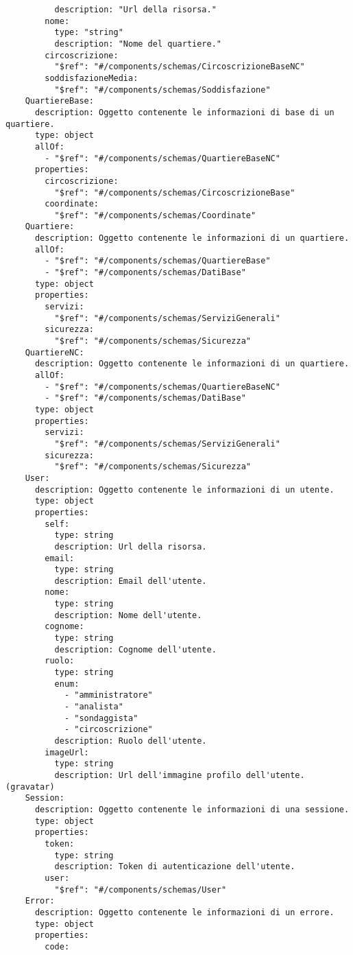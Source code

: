 \begin{verbatim}
          description: "Url della risorsa."
        nome:
          type: "string"
          description: "Nome del quartiere."
        circoscrizione:
          "$ref": "#/components/schemas/CircoscrizioneBaseNC"
        soddisfazioneMedia:
          "$ref": "#/components/schemas/Soddisfazione"
    QuartiereBase: 
      description: Oggetto contenente le informazioni di base di un quartiere.
      type: object
      allOf:
        - "$ref": "#/components/schemas/QuartiereBaseNC"
      properties:
        circoscrizione:
          "$ref": "#/components/schemas/CircoscrizioneBase"
        coordinate:
          "$ref": "#/components/schemas/Coordinate"
    Quartiere: 
      description: Oggetto contenente le informazioni di un quartiere.
      allOf:
        - "$ref": "#/components/schemas/QuartiereBase"
        - "$ref": "#/components/schemas/DatiBase"
      type: object
      properties:
        servizi:
          "$ref": "#/components/schemas/ServiziGenerali"
        sicurezza:
          "$ref": "#/components/schemas/Sicurezza"
    QuartiereNC:
      description: Oggetto contenente le informazioni di un quartiere.
      allOf:
        - "$ref": "#/components/schemas/QuartiereBaseNC"
        - "$ref": "#/components/schemas/DatiBase"
      type: object
      properties:
        servizi:
          "$ref": "#/components/schemas/ServiziGenerali"
        sicurezza:
          "$ref": "#/components/schemas/Sicurezza"
    User:
      description: Oggetto contenente le informazioni di un utente.
      type: object
      properties:
        self:
          type: string
          description: Url della risorsa.
        email:
          type: string
          description: Email dell'utente.
        nome:
          type: string
          description: Nome dell'utente.
        cognome:
          type: string
          description: Cognome dell'utente.
        ruolo:
          type: string
          enum:
            - "amministratore"
            - "analista"
            - "sondaggista"
            - "circoscrizione"
          description: Ruolo dell'utente.
        imageUrl: 
          type: string
          description: Url dell'immagine profilo dell'utente. (gravatar)
    Session: 
      description: Oggetto contenente le informazioni di una sessione.
      type: object
      properties:
        token:
          type: string
          description: Token di autenticazione dell'utente.
        user:
          "$ref": "#/components/schemas/User"
    Error:
      description: Oggetto contenente le informazioni di un errore.
      type: object
      properties:
        code:

\end{verbatim}
